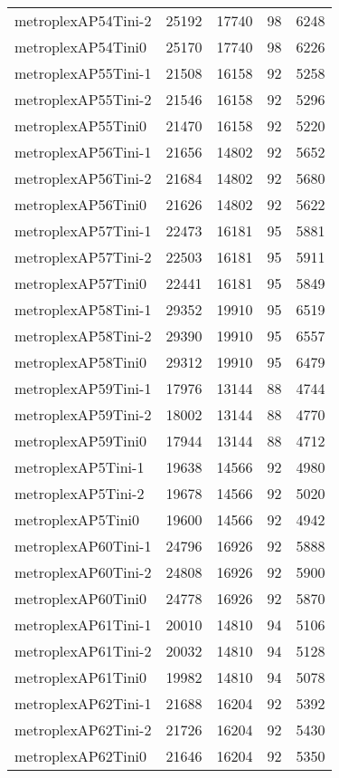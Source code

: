 \begin{longtable}{lrrrr}
metroplexAP54Tini-2 & 25192 & 17740 & 98 & 6248 \\
metroplexAP54Tini0 & 25170 & 17740 & 98 & 6226 \\
metroplexAP55Tini-1 & 21508 & 16158 & 92 & 5258 \\
metroplexAP55Tini-2 & 21546 & 16158 & 92 & 5296 \\
metroplexAP55Tini0 & 21470 & 16158 & 92 & 5220 \\
metroplexAP56Tini-1 & 21656 & 14802 & 92 & 5652 \\
metroplexAP56Tini-2 & 21684 & 14802 & 92 & 5680 \\
metroplexAP56Tini0 & 21626 & 14802 & 92 & 5622 \\
metroplexAP57Tini-1 & 22473 & 16181 & 95 & 5881 \\
metroplexAP57Tini-2 & 22503 & 16181 & 95 & 5911 \\
metroplexAP57Tini0 & 22441 & 16181 & 95 & 5849 \\
metroplexAP58Tini-1 & 29352 & 19910 & 95 & 6519 \\
metroplexAP58Tini-2 & 29390 & 19910 & 95 & 6557 \\
metroplexAP58Tini0 & 29312 & 19910 & 95 & 6479 \\
metroplexAP59Tini-1 & 17976 & 13144 & 88 & 4744 \\
metroplexAP59Tini-2 & 18002 & 13144 & 88 & 4770 \\
metroplexAP59Tini0 & 17944 & 13144 & 88 & 4712 \\
metroplexAP5Tini-1 & 19638 & 14566 & 92 & 4980 \\
metroplexAP5Tini-2 & 19678 & 14566 & 92 & 5020 \\
metroplexAP5Tini0 & 19600 & 14566 & 92 & 4942 \\
metroplexAP60Tini-1 & 24796 & 16926 & 92 & 5888 \\
metroplexAP60Tini-2 & 24808 & 16926 & 92 & 5900 \\
metroplexAP60Tini0 & 24778 & 16926 & 92 & 5870 \\
metroplexAP61Tini-1 & 20010 & 14810 & 94 & 5106 \\
metroplexAP61Tini-2 & 20032 & 14810 & 94 & 5128 \\
metroplexAP61Tini0 & 19982 & 14810 & 94 & 5078 \\
metroplexAP62Tini-1 & 21688 & 16204 & 92 & 5392 \\
metroplexAP62Tini-2 & 21726 & 16204 & 92 & 5430 \\
metroplexAP62Tini0 & 21646 & 16204 & 92 & 5350 \\

\end{longtable}
